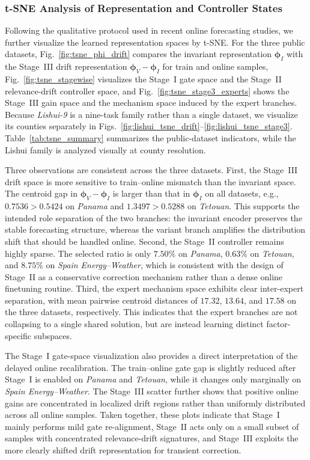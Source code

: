 ﻿\documentclass[journal]{IEEEtran}
\begin{document}
\subsubsection{t-SNE Analysis of Representation and Controller States}
Following the qualitative protocol used in recent online forecasting studies, we further visualize the learned representation spaces by t-SNE. For the three public datasets, Fig.~\ref{fig:tsne_phi_drift} compares the invariant representation $\boldsymbol{\phi}_{I}$ with the Stage~III drift representation $\boldsymbol{\phi}_{V}-\boldsymbol{\phi}_{I}$ for train and online samples, Fig.~\ref{fig:tsne_stagewise} visualizes the Stage~I gate space and the Stage~II relevance-drift controller space, and Fig.~\ref{fig:tsne_stage3_experts} shows the Stage~III gain space and the mechanism space induced by the expert branches. Because \textit{Lishui-9} is a nine-task family rather than a single dataset, we visualize its counties separately in Figs.~\ref{fig:lishui_tsne_drift}--\ref{fig:lishui_tsne_stage3}. Table~\ref{tab:tsne_summary} summarizes the public-dataset indicators, while the Lishui family is analyzed visually at county resolution.

Three observations are consistent across the three datasets. First, the Stage~III drift space is more sensitive to train--online mismatch than the invariant space. The centroid gap in $\boldsymbol{\phi}_{V}-\boldsymbol{\phi}_{I}$ is larger than that in $\boldsymbol{\phi}_{I}$ on all datasets, e.g., $0.7536>0.5424$ on \textit{Panama} and $1.3497>0.5288$ on \textit{Tetouan}. This supports the intended role separation of the two branches: the invariant encoder preserves the stable forecasting structure, whereas the variant branch amplifies the distribution shift that should be handled online. Second, the Stage~II controller remains highly sparse. The selected ratio is only $7.50\%$ on \textit{Panama}, $0.63\%$ on \textit{Tetouan}, and $8.75\%$ on \textit{Spain Energy--Weather}, which is consistent with the design of Stage~II as a conservative correction mechanism rather than a dense online finetuning routine. Third, the expert mechanism space exhibits clear inter-expert separation, with mean pairwise centroid distances of $17.32$, $13.64$, and $17.58$ on the three datasets, respectively. This indicates that the expert branches are not collapsing to a single shared solution, but are instead learning distinct factor-specific subspaces.

The Stage~I gate-space visualization also provides a direct interpretation of the delayed online recalibration. The train--online gate gap is slightly reduced after Stage~I is enabled on \textit{Panama} and \textit{Tetouan}, while it changes only marginally on \textit{Spain Energy--Weather}. The Stage~III scatter further shows that positive online gains are concentrated in localized drift regions rather than uniformly distributed across all online samples. Taken together, these plots indicate that Stage~I mainly performs mild gate re-alignment, Stage~II acts only on a small subset of samples with concentrated relevance-drift signatures, and Stage~III exploits the more clearly shifted drift representation for transient correction.
\end{document}
